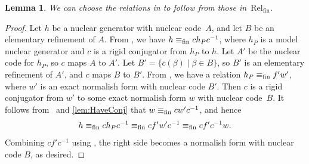 \documentclass[11pt,letterpaper]{amsart}
\newtheorem{lemma}[theorem]{Lemma}
\theoremstyle{definition}
\newcommand{\Rel}{\mathrm{Rel}}
\begin{document}
\begin{lemma}\label{lem:HaveRefine}
We can choose the relations in\/ {\normalfont\Refine} to follow from those in\/~$\Rel_{\mathrm{fin}}$.
\end{lemma}
\begin{proof}
Let $h$ be a nuclear generator with nuclear code~$A$, and let $B$ be an elementary refinement of $A$.  From \Model, we have $h\equiv_{\mathrm{fin}} ch_Pc^{-1}$, where $h_P$ is a model nuclear generator and $c$ is a rigid conjugator from $h_P$ to $h$. Let $A'$ be the nuclear code for $h_P$, so $c$ maps $A$ to $A'$.  Let $B'=\{\overline{c}(\beta) \mid \beta \in B\}$, so $B'$ is an elementary refinement of $A'$, and $c$ maps $B$ to $B'$.  From \RefineFin, we have a relation $h_P \equiv_{\mathrm{fin}} f'w'$, where $w'$ is an exact normalish form with nuclear code $B'$. Then $c$ is a rigid conjugator from $w'$ to some exact normalish form $w$ with nuclear code~$B$. It follows from \Conj\ and \cref{lem:HaveConj} that $w\equiv_{\mathrm{fin}} cw'c^{-1}$, and hence
\[
h\equiv_{\mathrm{fin}} ch_Pc^{-1} \equiv_{\mathrm{fin}} cf'w'c^{-1} \equiv_{\mathrm{fin}} cf'c^{-1}w.
\]
Combining $cf'c^{-1}$ using \VRel, the right side becomes a normalish form with nuclear code $B$, as desired.
\end{proof}
\end{document}
